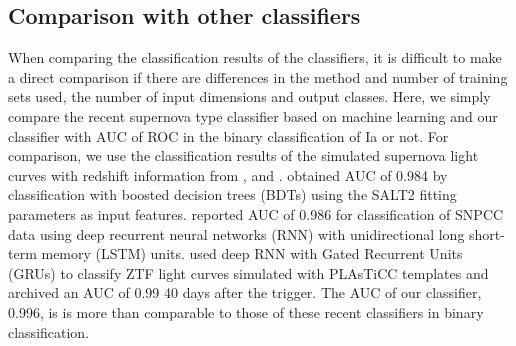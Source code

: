 \documentclass[useamsfonts]{pasj01}
\begin{document}
\subsection{Comparison with other classifiers}
%
When comparing the classification results of the classifiers, it is difficult to make a direct comparison if there are differences in the method and number of training sets used, the number of input dimensions and output classes. 
Here, we simply compare the recent supernova type classifier based on machine learning and our classifier with AUC of ROC in the binary classification of Ia or not.
For comparison, we use the classification results of the simulated supernova light curves with redshift information from \citet{Lochner_2016}, \citet{charnock17a} and \citet{Muthukrishna_2019}.
\citet{Lochner_2016} obtained AUC of 0.984 by classification with boosted decision trees (BDTs) using the SALT2 fitting parameters as input features.
\citet{charnock17a} reported AUC of 0.986 for classification of SNPCC data using deep recurrent neural networks (RNN) with unidirectional long short-term memory (LSTM) units.
\citet{Muthukrishna_2019} used deep RNN with Gated Recurrent Units (GRUs) to classify  ZTF light curves simulated with PLAsTiCC templates and archived an AUC of 0.99 40 days after the trigger.
The AUC of our classifier, 0.996, is is more than comparable to those of these recent classifiers in binary classification.
\end{document}

